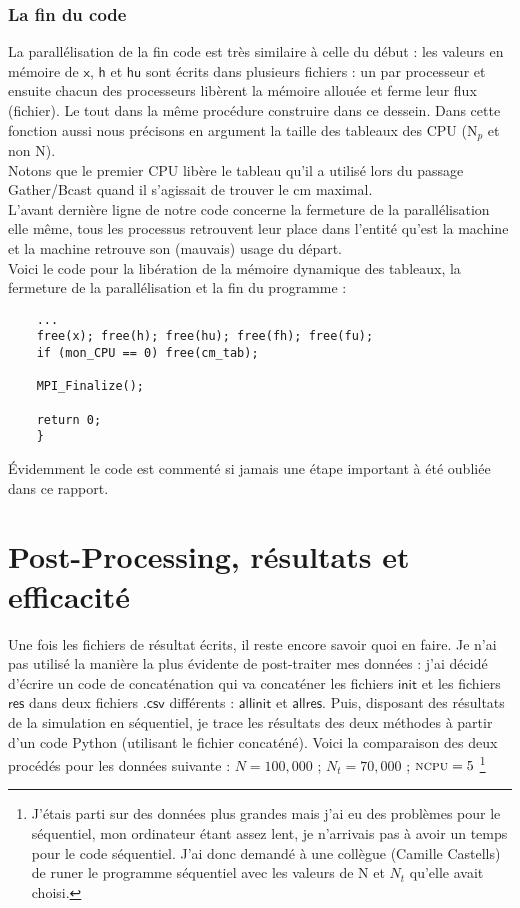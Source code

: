 \documentclass[french]{article}
\newcommand{\navy}{\color{navy}}
\newcommand{\choco}{\color{choco}}
\newcommand{\bk}{\color{black}}
\newcommand{\xhhu}{$\mathsf{x}$, $\mathsf{h}$ et $\mathsf{hu}$}
\begin{document}
\choco \subsubsection*{La fin du code} \bk
La parallélisation de la fin code est très similaire à celle du début : les valeurs en mémoire de \xhhu $ $ sont écrits dans plusieurs fichiers : un par processeur et ensuite chacun des processeurs libèrent la mémoire allouée et ferme leur flux (fichier). Le tout dans la même procédure construire dans ce dessein. Dans cette fonction aussi nous précisons en argument la taille des tableaux des CPU (N$_p$ et non N).\\
Notons que le premier CPU libère le tableau qu'il a utilisé lors du passage Gather/Bcast quand il s'agissait de trouver le cm maximal.\\
L'avant dernière ligne de notre code concerne la fermeture de la parallélisation elle même, tous les processus retrouvent leur place dans l'entité qu'est la machine et la machine retrouve son (mauvais) usage du départ.\\
 Voici le code pour la libération de la mémoire dynamique des tableaux, la fermeture de la parallélisation et la fin du programme :
 
 \begin{minipage}{455 pt}
 \begin{lstlisting}
	...  	
  	free(x); free(h); free(hu); free(fh); free(fu);
  	if (mon_CPU == 0) free(cm_tab);
  
  	MPI_Finalize();
  
  	return 0;
	}
 \end{lstlisting}
 \end{minipage}
 
 Évidemment le code est commenté si jamais une étape important à été oubliée dans ce rapport.

\pagebreak

\navy \section{Post-Processing, résultats et efficacité} \bk
Une fois les fichiers de résultat écrits, il reste encore savoir quoi en faire. Je n'ai pas utilisé la manière la plus évidente de post-traiter mes données : j'ai décidé d'écrire un code de concaténation qui va concaténer les fichiers $\mathsf{init}$  et les fichiers $\mathsf{res}$ dans deux fichiers $\mathsf{.csv }$ différents : $\mathsf{allinit}$ et $\mathsf{allres}$. Puis, disposant des résultats de la simulation en séquentiel, je trace les résultats des deux méthodes à partir d'un code Python (utilisant le fichier concaténé). Voici la comparaison des deux procédés pour les données suivante : $N = 100,000$ ; $N_t = 70,000$ ; $\textsc{ncpu} = 5$ \footnote{J'étais parti sur des données plus grandes mais j'ai eu des problèmes pour le séquentiel, mon ordinateur étant assez lent, je n'arrivais pas à avoir un temps pour le code séquentiel. J'ai donc demandé à une collègue (Camille Castells) de runer le programme séquentiel avec les valeurs de N et $N_t$ qu'elle avait choisi.} 
\end{document}

